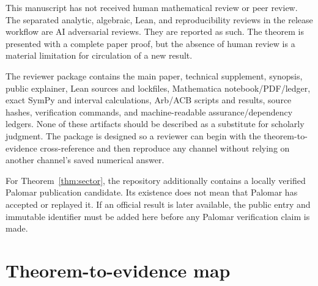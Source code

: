 \documentclass[12pt]{article}
\begin{document}
This manuscript has not received human mathematical review or peer review.
The separated analytic, algebraic, Lean, and reproducibility reviews in the
release workflow are AI adversarial reviews.  They are reported as such.
The theorem is presented with a complete paper proof, but the absence of
human review is a material limitation for circulation of a new result.

The reviewer package contains the main paper, technical supplement, synopsis,
public explainer, Lean sources and lockfiles, Mathematica notebook/PDF/ledger,
exact SymPy and interval calculations, Arb/ACB scripts and results, source
hashes, verification commands, and machine-readable assurance/dependency
ledgers.  None of these artifacts should be described as a substitute for
scholarly judgment.  The package is designed so a reviewer can begin with
the theorem-to-evidence cross-reference and then reproduce any channel
without relying on another channel's saved numerical answer.

For Theorem~\ref{thm:sector}, the repository additionally contains a locally
verified Palomar publication candidate.  Its existence does not mean that
Palomar has accepted or replayed it.  If an official result is later
available, the public entry and immutable identifier must be added here
before any Palomar verification claim is made.

\appendix
\section{Theorem-to-evidence map}\label{app:map}
\end{document}
